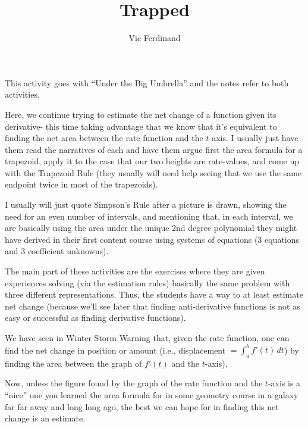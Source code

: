 \documentclass{ximera}
\author{Vic Ferdinand}
\title{Trapped}
\begin{document}
\begin{abstract}
\end{abstract}
\maketitle

\begin{instructorIntro}
This activity goes with ``Under the Big Umbrella'' and the notes refer to both activities.

Here, we continue trying to estimate the net change of a function given its derivative- this time taking advantage that we know that it's equivalent to finding the net area between the rate function and the $t$-axis.  I usually just have them read the narratives of each and have them argue first the area formula for a trapezoid, apply it to the case that our two heights are rate-values, and come up with the Trapezoid Rule (they usually will need help seeing that we use the same endpoint twice in most of the trapezoids).  

I usually will just quote Simpson's Rule after a picture is drawn, showing the need for an even number of intervals, and mentioning that, in each interval, we are basically using the area under the unique 2nd degree polynomial they might have derived in their first content course using systems of equations (3 equations and 3 coefficient unknowns).

The main part of these activities are the exercises where they are given experiences solving (via the estimation rules) basically the same problem with three different representations.
Thus, the students have a way to at least estimate net change (because we'll see later that finding anti-derivative functions is not as easy or successful as finding derivative functions). 

\end{instructorIntro}



We have seen in Winter Storm Warning that, given the rate function, one can find the net change in position or amount (i.e., displacement $=\int_a^b f'(t) \, dt$) by finding the area between the graph of $f'(t)$ and the $t$-axis).  

     Now, unless the figure found by the graph of the rate function and the $t$-axis is a ``nice'' one you learned the area formula for in some geometry course in a galaxy far far away and long long ago, the best we can hope for in finding this net change is an estimate.
     
\end{document}
